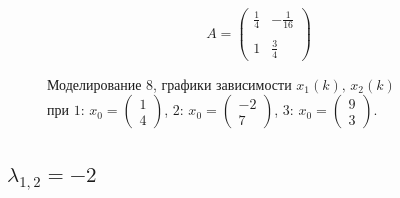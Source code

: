 \documentclass[a5paper, 10pt]{article}
\theoremstyle{definition}
\theoremstyle{plain}
\theoremstyle{remark}
\begin{document}
\begin{equation}
A =
\begin{pmatrix}
  \frac{1}{4} &  -\frac{1}{16}\\
\\
1 & \frac{3}{4}
\end{pmatrix}
\end{equation}
\begin{figure}[h!]
\caption{Моделирование 8, графики зависимости $x_1 \left( k \right), \, x_2 \left( k \right)$ \\ при  $1: \, x_0 = \begin{pmatrix} 1 \\ 4 \end{pmatrix}$, $2: \, x_0 = \begin{pmatrix} -2 \\ 7 \end{pmatrix}$, $3: \, x_0 = \begin{pmatrix} 9 \\ 3 \end{pmatrix}$.}
\end{figure}



\subsection{$\lambda_{1, 2} = -2$}
\end{document}
